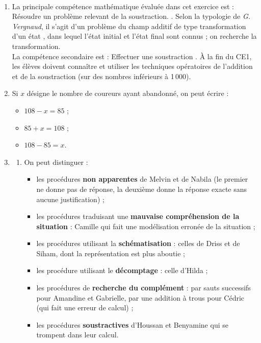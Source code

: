 \begin{corrige}
\ \\ [-5mm]
\begin{enumerate}
   \item La principale compétence mathématique évaluée dans cet exercice est : \og Résoudre un problème relevant de la soustraction. \fg{}. Selon la typologie de {\it G. Vergnaud}, il s'agit d'un problème du champ additif de type \og transformation d'un état \fg, dans lequel l'état initial et l'état final sont connus ; on recherche la transformation. \\
   La compétence secondaire est : \og Effectuer une soustraction \fg{}. À la fin du CE1, les élèves doivent connaître et utiliser les techniques opératoires de l'addition et de la soustraction (sur des nombres inférieurs à 1\,000).
   \item Si $x$ désigne le nombre de coureurs ayant abandonné, on peut écrire : 
   \begin{itemize}
      \item $108-x = 85$ ;
      \item $85+x =108$ ;
      \item $108-85 = x$.
   \end{itemize}
   \item
   \begin{enumerate}
      \item On peut distinguer :
      \begin{itemize}
         \item les procédures {\bf non apparentes} de Melvin et de Nabila (le premier ne donne pas de réponse, la deuxième donne la réponse exacte sans aucune justification) ;
         \item les procédures traduisant une {\bf mauvaise compréhension de la situation} : Camille qui fait une modélisation erronée de la situation ;
         \item les procédures utilisant la {\bf schématisation} : celles de Driss et de Siham, dont la représentation est plus aboutie ;
         \item les procédure utilisant le {\bf décomptage} : celle d'Hilda ;
         \item les procédures de {\bf recherche du complément} : par sauts successifs pour Amandine et Gabrielle, par une addition à trous pour Cédric (qui fait une erreur de calcul) ;
         \item les procédures {\bf soustractives} d'Houssan et Benyamine qui se trompent dans leur calcul.
      \end{itemize}

\end{enumerate}
\end{enumerate}
\end{corrige}

